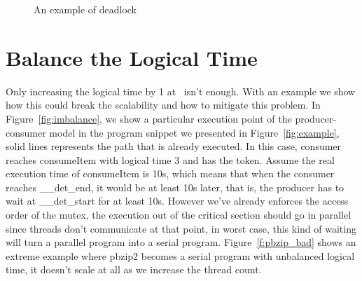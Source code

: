 \begin{figure}
\centering
{}
\caption{An example of deadlock}
\label{fig:deadlock}
\end{figure}

\section{Balance the Logical Time} \label{sec:logimbalance}
Only increasing the logical time by 1 at \detend\ isn't enough. With an example we show how this could break the scalability and how to mitigate this problem. In Figure~\ref{fig:imbalance}, we show a particular execution point of the producer-consumer model in the program snippet we presented in Figure~\ref{fig:example}, solid lines represents the path that is already executed. In this case, consumer reaches consumeItem with logical time 3 and has the token. Assume the real execution time of consumeItem is 10s, which means that when the consumer reaches \_\_det\_end, it would be at least 10s later, that is, the producer has to wait at \_\_det\_start for at least 10s. However we've already enforces the access order of the mutex, the execution out of the critical section should go in parallel since threads don't communicate at that point, in worst case, this kind of waiting will turn a parallel program into a serial program. Figure~\ref{f:pbzip_bad} shows an extreme example where pbzip2 becomes a serial program with unbalanced logical time, it doesn't scale at all as we increase the thread count.

